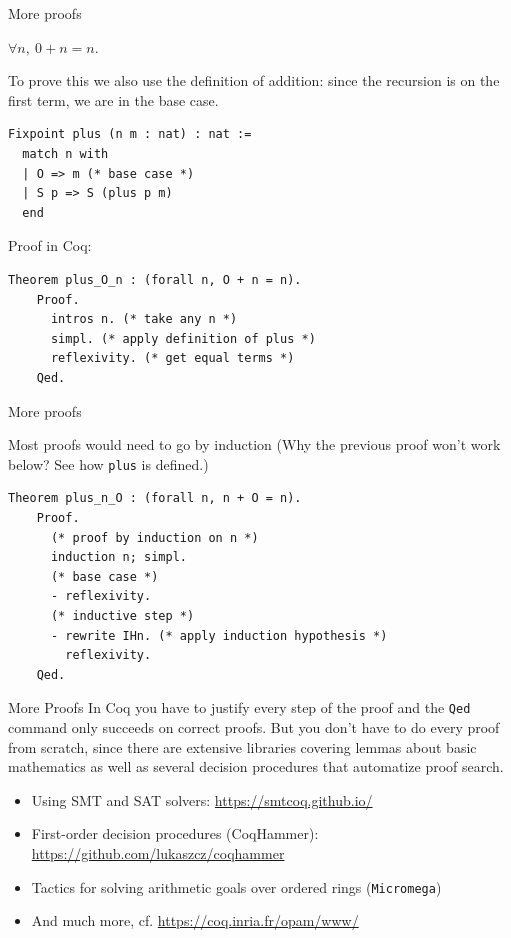 \documentclass[10pt]{beamer}
\begin{document}
\begin{frame}[fragile]{More proofs}
\begin{theorem} $\forall n,\ 0 + n = n$.
\end{theorem}

To prove this we also use the definition of addition: since the recursion is on the first term, we are in the base case.

   \begin{lstlisting}[language=Coq]
  Fixpoint plus (n m : nat) : nat :=
  match n with
  | O => m (* base case *)
  | S p => S (plus p m)
  end
   \end{lstlisting}

   Proof in Coq:

  \begin{lstlisting}[language=Coq]
    Theorem plus_O_n : (forall n, O + n = n).
    Proof.
      intros n. (* take any n *)
      simpl. (* apply definition of plus *)
      reflexivity. (* get equal terms *)
    Qed.
  \end{lstlisting}

 
\end{frame}



\begin{frame}[fragile]{More proofs}

  Most proofs would need to go by induction (Why the previous proof won't work below? See how \texttt{plus} is defined.)

  \begin{lstlisting}[language=Coq]
    Theorem plus_n_O : (forall n, n + O = n).
    Proof.
      (* proof by induction on n *)
      induction n; simpl.
      (* base case *)
      - reflexivity.
      (* inductive step *)
      - rewrite IHn. (* apply induction hypothesis *)
        reflexivity.
    Qed.

  \end{lstlisting}
\end{frame}
\begin{frame}{More Proofs}
     In Coq you have to justify every step of the proof and the \texttt{Qed} command only succeeds on correct proofs. But you don't have to do every proof from scratch, since there are extensive libraries covering lemmas about basic mathematics as well as several decision procedures that automatize proof search.
     \begin{itemize}
     \item Using SMT and SAT solvers: \url{https://smtcoq.github.io/}
     \item First-order decision procedures (CoqHammer): \url{https://github.com/lukaszcz/coqhammer}
     \item Tactics for solving arithmetic goals over ordered rings (\texttt{Micromega})
       \item And much more, cf. \url{https://coq.inria.fr/opam/www/}
       \end{itemize}
  
\end{frame}
\end{document}
